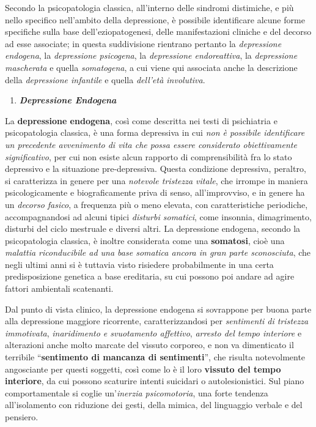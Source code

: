 \documentclass[]{article}
\begin{document}
Secondo la psicopatologia classica, all'interno delle sindromi
distimiche, e più nello specifico nell'ambito della depressione, è
possibile identificare alcune forme specifiche sulla base
dell'eziopatogenesi, delle manifestazioni cliniche e del decorso ad esse
associate; in questa suddivisione rientrano pertanto la
\emph{depressione endogena}, la \emph{depressione psicogena}, la
\emph{depressione endoreattiva}, la \emph{depressione mascherata} e
quella \emph{somatogena}, a cui viene qui associata anche la descrizione
della \emph{depressione infantile} e quella \emph{dell'età involutiva}.

\begin{enumerate}
\def\labelenumi{\arabic{enumi}.}
\item
  \textbf{\emph{Depressione Endogena}}
\end{enumerate}

La \textbf{depressione endogena}, così come descritta nei testi di
psichiatria e psicopatologia classica, è una forma depressiva in cui
\emph{non è possibile identificare un precedente avvenimento di vita che
possa essere considerato obiettivamente significativo}, per cui non
esiste alcun rapporto di comprensibilità fra lo stato depressivo e la
situazione pre-depressiva. Questa condizione depressiva, peraltro, si
caratterizza in genere per una \emph{notevole tristezza vitale}, che
irrompe in maniera psicologicamente e biograficamente priva di senso,
all'improvviso, e in genere ha un \emph{decorso fasico}, a frequenza più
o meno elevata, con caratteristiche periodiche, accompagnandosi ad
alcuni tipici \emph{disturbi somatici}, come insonnia, dimagrimento,
disturbi del ciclo mestruale e diversi altri. La depressione endogena,
secondo la psicopatologia classica, è inoltre considerata come una
\textbf{somatosi}, cioè una \emph{malattia riconducibile ad una base
somatica ancora in gran parte sconosciuta}, che negli ultimi anni si è
tuttavia visto risiedere probabilmente in una certa predisposizione
genetica a base ereditaria, su cui possono poi andare ad agire fattori
ambientali scatenanti.

Dal punto di vista clinico, la depressione endogena si sovrappone per
buona parte alla depressione maggiore ricorrente, caratterizzandosi per
\emph{sentimenti di tristezza immotivata}, \emph{inaridimento e
svuotamento affettivo}, \emph{arresto del tempo interiore} e alterazioni
anche molto marcate del vissuto corporeo, e non va dimenticato il
terribile ``\textbf{sentimento di mancanza di sentimenti}'', che risulta
notevolmente angosciante per questi soggetti, così come lo è il loro
\textbf{vissuto del tempo interiore}, da cui possono scaturire intenti
suicidari o autolesionistici. Sul piano comportamentale si coglie
un'\emph{inerzia psicomotoria}, una forte tendenza all'isolamento con
riduzione dei gesti, della mimica, del linguaggio verbale e del
pensiero.
\end{document}
